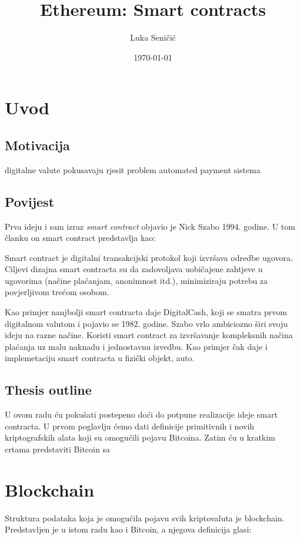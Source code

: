 \documentclass[12pt]{report}
\title{Ethereum: Smart contracts}
\author{Luka Seničić}
\date{\today}
\begin{document}
\maketitle

\tableofcontents

\chapter{Uvod}
\section{Motivacija}

digitalne valute pokusavaju rjesit problem automated payment sistema

\section{Povijest}

Prva ideju i sam izraz \emph{smart contract} objavio je Nick Szabo 1994. godine\cite{smart_contract_idea}. U tom članku on smart contract predstavlja kao:
\begin{definicija}
Smart contract je digitalni transakcijski protokol koji izvršava odredbe ugovora. Ciljevi dizajna smart contracta su da zadovoljava uobičajene zahtjeve u ugovorima (načine plaćanjam, anonimnost itd.), minimiziraju potrebu za povjerljivom trećom osobom.
\end{definicija}
Kao primjer nanjbolji smart contracta daje DigitalCash, koji se smatra prvom digitalnom valutom i pojavio se 1982. godine\cite{digi_cash}. Szabo vrlo ambiciozno širi svoju ideju na razne načine. Koristi smart contract za izvršavanje kompleksnih načina plaćanja uz malu naknadu i jednostavnu izvedbu. Kao primjer čak daje i implemetaciju smart contracta u fizički objekt, auto.

\section{Thesis outline}

U ovom radu ću pokušati postepeno doći do potpune realizacije ideje smart contracta. U prvom poglavlju ćemo dati definicije primitivnih i novih kriptografskih alata koji su omogućili pojavu Bitcoina. Zatim ću u kratkim crtama predstaviti Bitcoin sa 

\chapter{Blockchain}
Struktura podataka koja je omogućila pojavu svih kriptovaluta je blockchain. Predstavljen je u istom radu kao i Bitcoin\cite{bitcoin}, a njegova definicija glasi:
\end{document}
